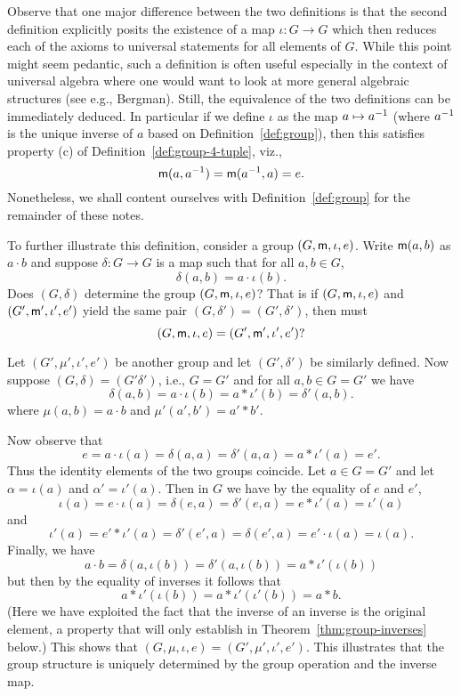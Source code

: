 Observe that one major difference between the two definitions is that the second
definition explicitly posits the existence of a map \(\iota: G \to G\) which
then reduces each of the axioms to universal statements for all elements of
\(G\). While this point might seem pedantic, such a definition is often useful
especially in the context of universal algebra where one would want to look at
more general algebraic structures (see e.g., Bergman). Still, the equivalence of
the two definitions can be immediately deduced. In particular if we define
\(\iota\) as the map \(a \mapsto a^{-1}\) (where \(a^{-1}\) is the unique inverse
of \(a\) based on Definition~\ref{def:group}), then this satisfies property (c)
of Definition~\ref{def:group-4-tuple}, viz.,
\[
    {\mathsf{m}}(a, a^{-1}) = {\mathsf{m}}(a^{-1}, a) = e.
\]
Nonetheless, we shall content ourselves with Definition~\ref{def:group} for the
remainder of these notes.

To further illustrate this definition, consider a group \((G, {\mathsf{m}}, \iota,
e)\). Write \({\mathsf{m}}(a,b)\) as \(a\cdot b\) and suppose \(\delta : G \to G\) is a
map such that for all \(a, b \in G\),
\[
    \delta(a, b) = a\cdot\iota(b).
\]
Does \((G, \delta)\) determine the group \((G, {\mathsf{m}}, \iota, e)\)? That is if
\((G, {\mathsf{m}}, \iota, e)\) and \((G', {\mathsf{m}}', \iota', e')\) yield the same pair
\((G, \delta') = (G', \delta')\), then must
\[(G, {\mathsf{m}}, \iota, e) = (G', {\mathsf{m}}', \iota', e')?\]

Let \((G', \mu', \iota', e')\) be another group and let \((G', \delta')\) be
similarly defined. Now suppose \((G, \delta) = (G' \delta')\), i.e., \(G = G'\)
and for all \(a, b \in G = G'\) we have
\[
\delta(a, b) = a \cdot \iota(b) = a * \iota'(b) = \delta'(a, b).
\]
where \(\mu(a, b) = a \cdot b\) and \(\mu'(a', b') = a' * b'\).

Now observe that
\[
e = a \cdot \iota(a) = \delta(a, a) = \delta'(a, a) = a * \iota'(a) = e'.
\]
Thus the identity elements of the two groups coincide. Let \(a \in G = G'\) and
let \(\alpha = \iota(a)\) and \(\alpha' = \iota'(a)\). Then in \(G\) we have by
the equality of \(e\) and \(e'\),
\[
\iota(a) = e \cdot \iota(a) = \delta(e, a) = \delta'(e, a) = e * \iota'(a) = \iota'(a)
\]
and
\[
 \iota'(a) = e' * \iota'(a) = \delta'(e', a) = \delta(e',a) = e' \cdot \iota(a) = \iota(a).
\]
Finally, we have
\[
a \cdot b = \delta(a, \iota(b)) = \delta'(a, \iota(b)) = a * \iota'(\iota(b))
\]
but then by the equality of inverses it follows that
\[
 a * \iota'(\iota(b)) = a * \iota'(\iota'(b)) = a * b.
\]
(Here we have exploited the fact that the inverse of an inverse is the original
element, a property that will only establish in Theorem~\ref{thm:group-inverses}
below.) This shows that \((G, \mu, \iota, e) = (G', \mu', \iota', e')\). This
illustrates that the group structure is uniquely determined by the group
operation and the inverse map.

